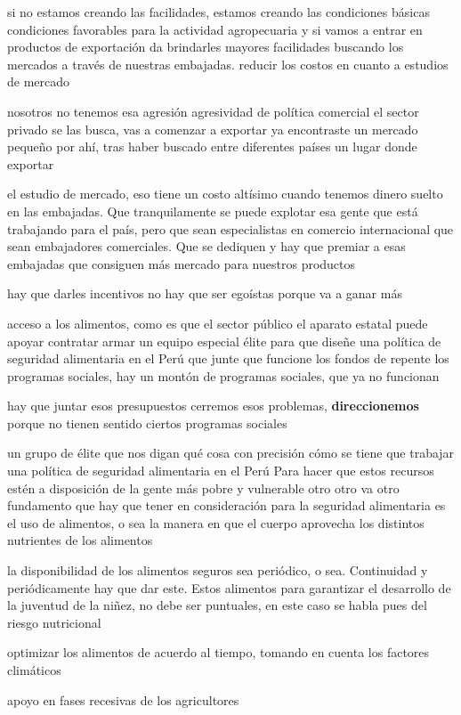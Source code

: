 \documentclass[
  a4paper,
]{article}
\begin{document}
si no estamos creando las facilidades, estamos creando las condiciones
básicas condiciones favorables para la actividad agropecuaria y si vamos
a entrar en productos de exportación da brindarles mayores facilidades
buscando los mercados a través de nuestras embajadas. reducir los costos
en cuanto a estudios de mercado

nosotros no tenemos esa agresión agresividad de política comercial el
sector privado se las busca, vas a comenzar a exportar ya encontraste un
mercado pequeño por ahí, tras haber buscado entre diferentes países un
lugar donde exportar

el estudio de mercado, eso tiene un costo altísimo cuando tenemos dinero
suelto en las embajadas. Que tranquilamente se puede explotar esa gente
que está trabajando para el país, pero que sean especialistas en
comercio internacional que sean embajadores comerciales. Que se dediquen
y hay que premiar a esas embajadas que consiguen más mercado para
nuestros productos

hay que darles incentivos no hay que ser egoístas porque va a ganar más

acceso a los alimentos, como es que el sector público el aparato estatal
puede apoyar contratar armar un equipo especial élite para que diseñe
una política de seguridad alimentaria en el Perú que junte que funcione
los fondos de repente los programas sociales, hay un montón de programas
sociales, que ya no funcionan

hay que juntar esos presupuestos cerremos esos problemas,
\textbf{direccionemos} porque no tienen sentido ciertos programas
sociales

un grupo de élite que nos digan qué cosa con precisión cómo se tiene que
trabajar una política de seguridad alimentaria en el Perú Para hacer que
estos recursos estén a disposición de la gente más pobre y vulnerable
otro otro va otro fundamento que hay que tener en consideración para la
seguridad alimentaria es el uso de alimentos, o sea la manera en que el
cuerpo aprovecha los distintos nutrientes de los alimentos

la disponibilidad de los alimentos seguros sea periódico, o sea.
Continuidad y periódicamente hay que dar este. Estos alimentos para
garantizar el desarrollo de la juventud de la niñez, no debe ser
puntuales, en este caso se habla pues del riesgo nutricional

optimizar los alimentos de acuerdo al tiempo, tomando en cuenta los
factores climáticos

apoyo en fases recesivas de los agricultores
\end{document}
